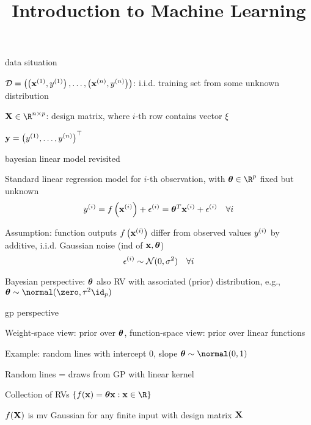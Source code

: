\documentclass[11pt,compress,t,notes=noshow, xcolor=table]{beamer}
\title{Introduction to Machine Learning}
\begin{document}


\begin{framei}{data situation}
\item $\mathcal{D} = \left( \left(\mathbf{x}^{(1)}, y^{(1)}\right), \ldots, \left(\mathbf{x}^{(n)}, y^{(n)}\right)\right)$: i.i.d. training set from some unknown distribution
\item $\Xmat \in \R^{n \times p}$: design matrix, where $i$-th row contains vector $\xi$
\item $\mathbf{y} = \left(y^{(1)}, \hdots, y^{(n)}\right)^\top$
\end{framei}

\begin{framei}[sep=L]{bayesian linear model revisited}
\item Standard linear regression model for $i$-th observation, with $\thetav \in \R^p$ fixed but unknown
$$y^{(i)} = f\left(\mathbf{x}^{(i)}\right) + \epsilon^{(i)} = \bm{\theta}^T \mathbf{x}^{(i)} + \epsilon^{(i)} \quad \forall i$$
\item Assumption: function outputs $f\left(\mathbf{x}^{(i)}\right)$ differ from observed values $y^{(i)}$ by additive, i.i.d. Gaussian noise (ind of $\mathbf{x}, \bm{\theta}$)
$$\epsilon^{(i)} \sim \mathcal{N}(0, \sigma^2) \quad \forall i$$ 
\item Bayesian perspective: $\bm{\theta}$ also RV with associated (prior) distribution, e.g., $\thetav \sim \normal(\zero, \tau^2 \id_p)$
\end{framei}

\begin{framei}{gp perspective}
\item Weight-space view: prior over $\bm{\theta}$, function-space view: prior over linear functions
\item Example: random lines with intercept 0, slope $\thetav \sim \normal(0, 1)$
\vfill
\item Random lines = draws from GP with linear kernel
\item Collection of RVs $\{ \fx = \thetav \xv: \xv \in \R\}$\item $f(\mathbf{X})$ is mv Gaussian for any finite input with design matrix $\mathbf{X}$
\end{framei}
\end{document}
